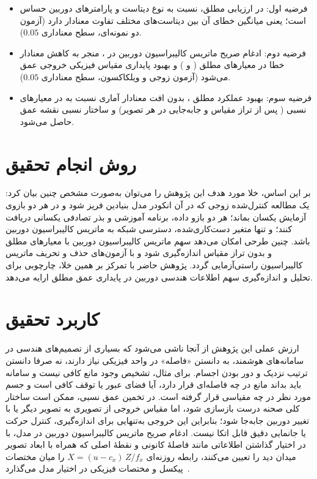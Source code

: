 \begin{itemize}
  \item فرضیه اول:
  \basemodel{} در ارزیابی مطلق،
  نسبت به نوع دیتاست و پارامترهای دوربین حساس است؛
  یعنی میانگین خطای آن بین دیتاست‌های مختلف تفاوت معنادار دارد
  (آزمون  دو نمونه‌ای، سطح معناداری $0.05$).

  \item فرضیه دوم:
  ادغام صریح ماتریس کالیبراسیون دوربین در \proposedmodel{}،
  منجر به کاهش معنادار خطا در معیارهای مطلق ( و )
  و بهبود پایداری مقیاس فیزیکی خروجی عمق می‌شود
  (آزمون  زوجی و ویلکاکسون، سطح معناداری $0.05$).

  \item فرضیه سوم:
  بهبود عملکرد مطلق \proposedmodel{}،
  بدون افت معنادار آماری نسبت به \controlmodel{} در معیارهای نسبی
  ( پس از تراز مقیاس و جابه‌جایی در هر تصویر)
  و ساختار نسبی نقشه عمق حاصل می‌شود.
\end{itemize}

\section{روش انجام تحقیق}
بر این اساس، خلا مورد هدف این پژوهش را می‌توان به‌صورت مشخص چنین بیان کرد: یک
مطالعه کنترل‌شده زوجی که در آن انکودر  مدل بنیادین فریز شود و در هر دو بازوی آزمایش یکسان بماند؛
هر دو بازو داده، برنامه آموزشی و بذر تصادفی یکسانی دریافت کنند؛
و تنها متغیر دست‌کاری‌شده، دسترسی شبکه به ماتریس کالیبراسیون دوربین باشد.
چنین طرحی امکان می‌دهد سهم ماتریس کالیبراسیون دوربین با معیارهای مطلق و بدون تراز مقیاس اندازه‌گیری
شود و با آزمون‌های حذف و تحریف ماتریس کالیبراسیون راستی‌آزمایی گردد. پژوهش حاضر با تمرکز بر همین
خلا، چارچوبی برای تحلیل و اندازه‌گیری سهم اطلاعات هندسی دوربین در پایداری عمق
مطلق ارایه می‌دهد.


\section{کاربرد تحقیق}
ارزش عملی این پژوهش از آنجا ناشی می‌شود که بسیاری از تصمیم‌های هندسی در سامانه‌های هوشمند، به دانستن «فاصله» در واحد فیزیکی نیاز دارند، نه صرفا دانستن ترتیب نزدیک و دور بودن اجسام. برای مثال، تشخیص وجود مانع کافی نیست و سامانه باید بداند مانع در چه فاصله‌ای قرار دارد، آیا فضای عبور یا توقف کافی است و جسم مورد نظر در چه مقیاسی قرار گرفته است. در تخمین عمق نسبی، ممکن است ساختار کلی صحنه درست بازسازی شود، اما مقیاس خروجی از تصویری به تصویر دیگر یا با تغییر دوربین جابه‌جا شود؛ بنابراین این خروجی به‌تنهایی برای اندازه‌گیری، کنترل حرکت یا جانمایی دقیق قابل اتکا نیست. ادغام صریح ماتریس کالیبراسیون دوربین در مدل، با در اختیار گذاشتن اطلاعاتی مانند فاصلهٔ کانونی و نقطهٔ اصلی که همراه با ابعاد تصویر میدان دید را تعیین می‌کنند، رابطه روزنه‌ای $X=(u-c_x)\,Z/f_x$ را میان مختصات پیکسل و مختصات فیزیکی در اختیار مدل می‌گذارد~\cite{HartleyZisserman2004,Facil2019CAMConvs,Yin2023Metric3D}.

